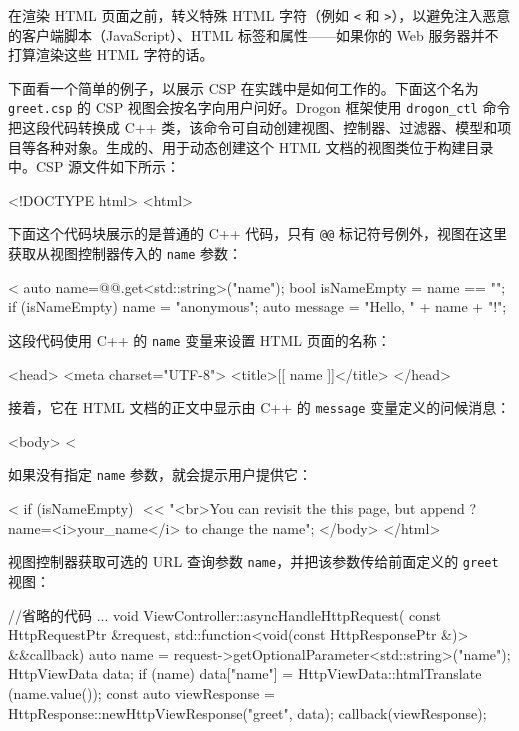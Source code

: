 在渲染 HTML 页面之前，转义特殊 HTML 字符（例如 \texttt{<} 和 \texttt{>}），以避免注入恶意的客户端脚本（JavaScript）、HTML 标签和属性——如果你的 Web 服务器并不打算渲染这些 HTML 字符的话。

\label{idx:1038}
下面看一个简单的例子，以展示 CSP 在实践中是如何工作的。下面这个名为 \texttt{greet.csp} 的 CSP 视图会按名字向用户问好。Drogon 框架使用 \texttt{drogon\_\allowbreak{}ctl} 命令把这段代码转换成 C++ 类，该命令可自动创建视图、控制器、过滤器、模型和项目等各种对象。生成的、用于动态创建这个 HTML 文档的视图类位于构建目录中。CSP 源文件如下所示：

\begin{codebox}[text]
<!DOCTYPE html>
<html>
\end{codebox}

下面这个代码块展示的是普通的 C++ 代码，只有 \texttt{@@} 标记符号例外，视图在这里获取从视图控制器传入的 \texttt{name} 参数：

\begin{codebox}[cpp]
<%
    auto name=@@.get<std::string>("name");
    bool isNameEmpty = name == "";
    if (isNameEmpty) name = "anonymous";
    auto message = "Hello, " + name + "!";
\end{codebox}

这段代码使用 C++ 的 \texttt{name} 变量来设置 HTML 页面的名称：

\begin{codebox}[text]
<head>
    <meta charset="UTF-8">
    <title>[[ name ]]</title>
</head>
\end{codebox}

接着，它在 HTML 文档的正文中显示由 C++ 的 \texttt{message} 变量定义的问候消息：

\begin{codebox}[text]
<body>
    <%
\end{codebox}

\label{idx:1039}
如果没有指定 \texttt{name} 参数，就会提示用户提供它：

\begin{codebox}[text]
    <%
    if (isNameEmpty)
    {
       $$ << "<br>You can revisit the this page, but append ?name=<i>your_name</i> to change the name";
    }
</body>
</html>
\end{codebox}

视图控制器获取可选的 URL 查询参数 \texttt{name}，并把该参数传给前面定义的 \texttt{greet} 视图：

\begin{codebox}[cpp]
//省略的代码
...
void ViewController::asyncHandleHttpRequest(
    const HttpRequestPtr &request,
    std::function<void(const HttpResponsePtr &)> &&callback) {
  auto name = request->getOptionalParameter<std::string>("name");
  HttpViewData data;
  if (name) {
    data["name"] = HttpViewData::htmlTranslate (name.value());
  }
  const auto viewResponse = HttpResponse::newHttpViewResponse("greet", data);
  callback(viewResponse);
}
\end{codebox}

